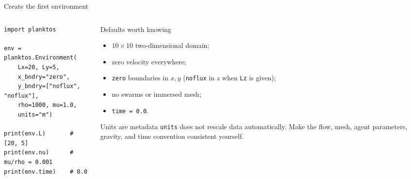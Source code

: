 \documentclass[aspectratio=169,11pt]{beamer}
\begin{document}
\begin{frame}[fragile]{Create the first environment}
\begin{columns}[T,onlytextwidth]
\begin{column}{0.56\textwidth}
\begin{lstlisting}
import planktos

env = planktos.Environment(
    Lx=20, Ly=5,
    x_bndry="zero",
    y_bndry=["noflux", "noflux"],
    rho=1000, mu=1.0,
    units="m")

print(env.L)       # [20, 5]
print(env.nu)      # mu/rho = 0.001
print(env.time)    # 0.0
\end{lstlisting}
\end{column}
\begin{column}{0.40\textwidth}
\begin{block}{Defaults worth knowing}
\begin{itemize}\itemsep4pt
  \item \(10\times10\) two-dimensional domain;
  \item zero velocity everywhere;
  \item \texttt{zero} boundaries in \(x,y\) (\texttt{noflux} in \(z\) when \texttt{Lz} is given);
  \item no swarms or immersed mesh;
  \item \texttt{time = 0.0}.
\end{itemize}
\end{block}
\begin{alertblock}{Units are metadata}
\texttt{units} does not rescale data automatically. Make the flow, mesh, agent parameters, gravity, and time convention consistent yourself.
\end{alertblock}
\end{column}
\end{columns}
\end{frame}
\end{document}
